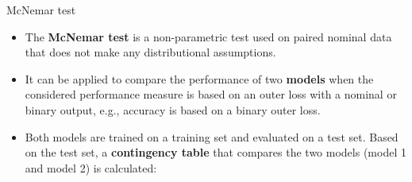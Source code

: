 \begin{vbframe}{McNemar test}
\begin{itemize}
\item The \textbf{McNemar test} is a non-parametric test used on paired nominal data that does not make any distributional assumptions.
\item It can be applied to compare the performance of two \textbf{models} when the considered performance measure is based on an outer loss with a nominal or binary output, e.g., accuracy is based on a binary outer loss.
\item Both models are trained on a training set and evaluated on a test set. Based on the test set, a \textbf{contingency table} that compares the two models (model 1 and model 2) is calculated:
\end{itemize}


\end{vbframe}
